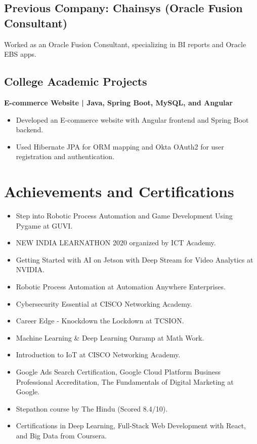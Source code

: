 \documentclass[letterpaper,10pt]{article}
\begin{document}
\subsection*{Previous Company: Chainsys (Oracle Fusion Consultant)}
Worked as an Oracle Fusion Consultant, specializing in BI reports and Oracle EBS apps.

\subsection*{College Academic Projects}

\textbf{E-commerce Website | Java, Spring Boot, MySQL, and Angular}
\begin{itemize}[left=0pt, label={}]
    \item Developed an E-commerce website with Angular frontend and Spring Boot backend.
    \item Used Hibernate JPA for ORM mapping and Okta OAuth2 for user registration and authentication.
\end{itemize}

\section*{Achievements and Certifications}

\begin{itemize}[left=0pt, label={}]
    \item Step into Robotic Process Automation and Game Development Using Pygame at GUVI.
    \item NEW INDIA LEARNATHON 2020 organized by ICT Academy.
    \item Getting Started with AI on Jetson with Deep Stream for Video Analytics at NVIDIA.
    \item Robotic Process Automation at Automation Anywhere Enterprises.
    \item Cybersecurity Essential at CISCO Networking Academy.
    \item Career Edge - Knockdown the Lockdown at TCSION.
    \item Machine Learning \& Deep Learning Onramp at Math Work.
    \item Introduction to IoT at CISCO Networking Academy.
    \item Google Ads Search Certification, Google Cloud Platform Business Professional Accreditation, The Fundamentals of Digital Marketing at Google.
    \item Stepathon course by The Hindu (Scored 8.4/10).
    \item Certifications in Deep Learning, Full-Stack Web Development with React, and Big Data from Coursera.
\end{itemize}
\end{document}
